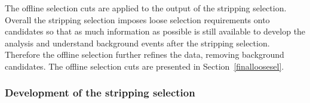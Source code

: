 
The offline selection cuts are applied to the output of the stripping selection. Overall the stripping selection imposes loose selection requirements onto \bmumu candidates so that as much information as possible is still available to develop the analysis and understand background events after the stripping selection. Therefore the offline selection further refines the data, removing background candidates. The offline selection cuts are presented in Section~\ref{finalloosesel}. 


 



\subsubsection{Development of the stripping selection}
\label{strippingold}

